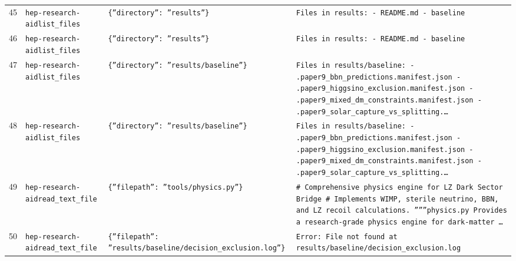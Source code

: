 \documentclass[11pt,a4paper]{article}
\begin{document}
\begin{longtable}{@{}p{}p{}p{}p{}@{}}
45 & \texttt{hep-research-aid}\newline\texttt{list\_\allowbreak{}files} & \texttt{\{''directory'':\allowbreak{} ''results''\}\allowbreak{}} & \texttt{Files in results:\allowbreak{}   - README.md   - baseline} \\
46 & \texttt{hep-research-aid}\newline\texttt{list\_\allowbreak{}files} & \texttt{\{''directory'':\allowbreak{} ''results''\}\allowbreak{}} & \texttt{Files in results:\allowbreak{}   - README.md   - baseline} \\
47 & \texttt{hep-research-aid}\newline\texttt{list\_\allowbreak{}files} & \texttt{\{''directory'':\allowbreak{} ''results/\allowbreak{}baseline''\}\allowbreak{}} & \texttt{Files in results/\allowbreak{}baseline:\allowbreak{}   - .paper9\_\allowbreak{}bbn\_\allowbreak{}predictions.manifest.json   - .paper9\_\allowbreak{}higgsino\_\allowbreak{}exclusion.manifest.json   - .paper9\_\allowbreak{}mixed\_\allowbreak{}dm\_\allowbreak{}constraints.manifest.json   - .paper9\_\allowbreak{}solar\_\allowbreak{}capture\_\allowbreak{}vs\_\allowbreak{}splitting.\ldots{}\allowbreak{}} \\
48 & \texttt{hep-research-aid}\newline\texttt{list\_\allowbreak{}files} & \texttt{\{''directory'':\allowbreak{} ''results/\allowbreak{}baseline''\}\allowbreak{}} & \texttt{Files in results/\allowbreak{}baseline:\allowbreak{}   - .paper9\_\allowbreak{}bbn\_\allowbreak{}predictions.manifest.json   - .paper9\_\allowbreak{}higgsino\_\allowbreak{}exclusion.manifest.json   - .paper9\_\allowbreak{}mixed\_\allowbreak{}dm\_\allowbreak{}constraints.manifest.json   - .paper9\_\allowbreak{}solar\_\allowbreak{}capture\_\allowbreak{}vs\_\allowbreak{}splitting.\ldots{}\allowbreak{}} \\
49 & \texttt{hep-research-aid}\newline\texttt{read\_\allowbreak{}text\_\allowbreak{}file} & \texttt{\{''filepath'':\allowbreak{} ''tools/\allowbreak{}physics.py''\}\allowbreak{}} & \texttt{\# Comprehensive physics engine for LZ Dark Sector Bridge \# Implements WIMP,\allowbreak{} sterile neutrino,\allowbreak{} BBN,\allowbreak{} and LZ recoil calculations.  ''''''physics.py  Provides a research-grade physics engine for dark-matter \ldots{}\allowbreak{}} \\
50 & \texttt{hep-research-aid}\newline\texttt{read\_\allowbreak{}text\_\allowbreak{}file} & \texttt{\{''filepath'':\allowbreak{} ''results/\allowbreak{}baseline/\allowbreak{}decision\_\allowbreak{}exclusion.log''\}\allowbreak{}} & \texttt{Error:\allowbreak{} File not found at results/\allowbreak{}baseline/\allowbreak{}decision\_\allowbreak{}exclusion.log} \\

\end{longtable}
\end{document}
